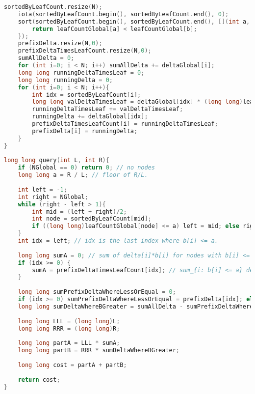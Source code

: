 \begin{lstlisting}[language=C++]
    sortedByLeafCount.resize(N);
    iota(sortedByLeafCount.begin(), sortedByLeafCount.end(), 0);
    sort(sortedByLeafCount.begin(), sortedByLeafCount.end(), [](int a, int b){
        return leafCountGlobal[a] < leafCountGlobal[b];
    });
    prefixDelta.resize(N,0);
    prefixDeltaTimesLeafCount.resize(N,0);
    sumAllDelta = 0;
    for (int i=0; i < N; i++) sumAllDelta += deltaGlobal[i];
    long long runningDeltaTimesLeaf = 0;
    long long runningDelta = 0;
    for (int i=0; i < N; i++){
        int idx = sortedByLeafCount[i];
        long long valDeltaTimesLeaf = deltaGlobal[idx] * (long long)leafCountGlobal[idx];
        runningDeltaTimesLeaf += valDeltaTimesLeaf;
        runningDelta += deltaGlobal[idx];
        prefixDeltaTimesLeafCount[i] = runningDeltaTimesLeaf;
        prefixDelta[i] = runningDelta;
    }
}
 
long long query(int L, int R){
    if (NGlobal == 0) return 0; // no nodes
    long long a = R / L; // floor of R/L.
 
    int left = -1;
    int right = NGlobal;
    while (right - left > 1){
        int mid = (left + right)/2;
        int node = sortedByLeafCount[mid];
        if ((long long)leafCountGlobal[node] <= a) left = mid; else right = mid;
    }
    int idx = left; // idx is the last index where b[i] <= a.
 
    long long sumA = 0; // sum of delta[i]*b[i] for nodes with b[i] <= a.
    if (idx >= 0) {
        sumA = prefixDeltaTimesLeafCount[idx]; // sum_{i: b[i] <= a} delta[i]*b[i]
    }
 
    long long sumPrefixDeltaWhereLessOrEqual = 0;
    if (idx >= 0) sumPrefixDeltaWhereLessOrEqual = prefixDelta[idx]; else sumPrefixDeltaWhereLessOrEqual = 0;
    long long sumDeltaWhereBGreater = sumAllDelta - sumPrefixDeltaWhereLessOrEqual;
 
    long long LLL = (long long)L;
    long long RRR = (long long)R;
 
    long long partA = LLL * sumA;
    long long partB = RRR * sumDeltaWhereBGreater;
 
    long long cost = partA + partB;
 
    return cost;
}
\end{lstlisting}

